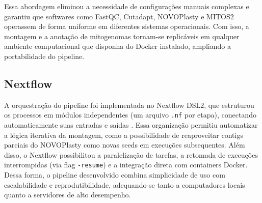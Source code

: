\begin{table}[H]
\centering
\caption{Imagens Docker utilizadas no pipeline.}
\label{tab:docker}
\footnotesize
{}%
\end{table}

Essa abordagem eliminou a necessidade de configurações manuais complexas e garantiu que softwares como FastQC, Cutadapt, NOVOPlasty e MITOS2 operassem de forma uniforme em diferentes sistemas operacionais. Com isso, a montagem e a anotação de mitogenomas tornam-se replicáveis em qualquer ambiente computacional que disponha do Docker instalado, ampliando a portabilidade do pipeline.

\subsection{Nextflow}

A orquestração do pipeline foi implementada no Nextflow DSL2, que estruturou os processos em módulos independentes (um arquivo \texttt{.nf} por etapa), conectando automaticamente suas entradas e saídas \cite{ditommaso2017}. Essa organização permitiu automatizar a lógica iterativa da montagem, como a possibilidade de reaproveitar contigs parciais do NOVOPlasty como novas seeds em execuções subsequentes. Além disso, o Nextflow possibilitou a paralelização de tarefas, a retomada de execuções interrompidas (via flag \texttt{-resume}) e a integração direta com containers Docker. Dessa forma, o pipeline desenvolvido combina simplicidade de uso com escalabilidade e reprodutibilidade, adequando-se tanto a computadores locais quanto a servidores de alto desempenho.

